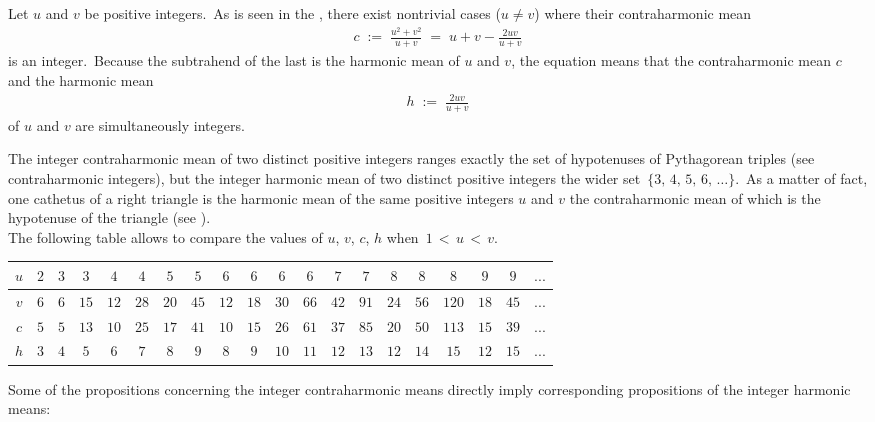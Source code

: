 \documentclass[12pt]{article}
\theoremstyle{definition}
\begin{document}
Let $u$ and $v$ be positive integers.\, As is seen in the , there exist nontrivial cases 
($u \neq v$) where their contraharmonic mean
\begin{align}
c \;:=\; \frac{u^2\!+\!v^2}{u\!+\!v} \;=\; u\!+\!v-\frac{2uv}{u\!+\!v}
\end{align}
is an integer.\,  Because the subtrahend of the last  is the harmonic mean of $u$ and $v$, the equation means that the contraharmonic mean $c$ and the harmonic mean 
\begin{align}
h \;:=\; \frac{2uv}{u\!+\!v}
\end{align}
of $u$ and $v$ are simultaneously integers.

The integer contraharmonic mean of two distinct positive 
integers ranges exactly the set of hypotenuses of Pythagorean 
triples (see contraharmonic integers), but the integer harmonic 
mean of two distinct positive integers the wider set\, 
$\{3,\,4,\,5,\,6,\,\ldots\}$.\, As a matter of fact, one 
cathetus of a right triangle is the harmonic mean of the same 
positive integers $u$ and $v$ the contraharmonic mean of which 
is the hypotenuse of the triangle (see 
).\\

The following table allows to compare the values of $u$, $v$, 
$c$, $h$ when\, $1\,<\,u\,<\,v$.

\begin{center}
\begin{tabular}{||c||c|c|c|c|c|c|c|c|c|c|c|c|c|c|c|c|c|c|c||}
\hline
$u$ & $2$ & $3$ & $3$ & $4$ & $4$ & $5$ & $5$ & $6$
& $6$ & $6$ & $6$ & $7$ & $7$ & $8$ & $8$ & $8$ & $9$ & $9$ & $...$\\
\hline
$v$ & $6$ & $6$ & $15$ & $12$ & $28$ & $20$ & $45$ & $12$ & $18$
& $30$ & $66$ & $42$ & $91$ & $24$ & $56$ & $120$ & $18$ & $45$ & $...$\\
\hline
$c$ & $5$ & $5$ & $13$ & $10$ & $25$ & $17$ & $41$ & $10$ & $15$
& $26$ & $61$ & $37$ & $85$ & $20$ & $50$& $113$ & $15$ & $39$ & $...$\\
\hline
$h$ & $3$ & $4$ & $5$ & $6$ & $7$ & $8$ & $9$ & $8$ & $9$
& $10$ & $11$ & $12$ & $13$ & $12$ & $14$& $15$ & $12$ & $15$ & $...$\\
\hline
\end{tabular}
\end{center}

Some of the propositions concerning the integer contraharmonic means directly imply corresponding propositions of the integer harmonic means:\\
\end{document}

